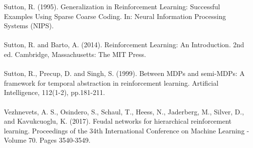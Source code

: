 \documentclass[notitlepage,a4paper,11pt]{article}
\begin{document}
Sutton, R. (1995). Generalization in Reinforcement Learning: Successful Examples Using Sparse Coarse Coding. In: Neural Information Processing Systems (NIPS).\\\\
Sutton, R. and Barto, A. (2014). Reinforcement Learning: An Introduction. 2nd ed. Cambridge, Massachusetts: The MIT Press.\\\\
Sutton, R., Precup, D. and Singh, S. (1999). Between MDPs and semi-MDPs: A framework for temporal abstraction in reinforcement learning. Artificial Intelligence, 112(1-2), pp.181-211.\\\\
Vezhnevets, A. S., Osindero, S., Schaul, T., Heess, N., Jaderberg, M., Silver, D., and Kavukcuoglu, K. (2017). Feudal networks for hierarchical reinforcement learning. Proceedings of the 34th International Conference on Machine Learning - Volume 70. Pages 3540-3549.\\\\
\end{document}
